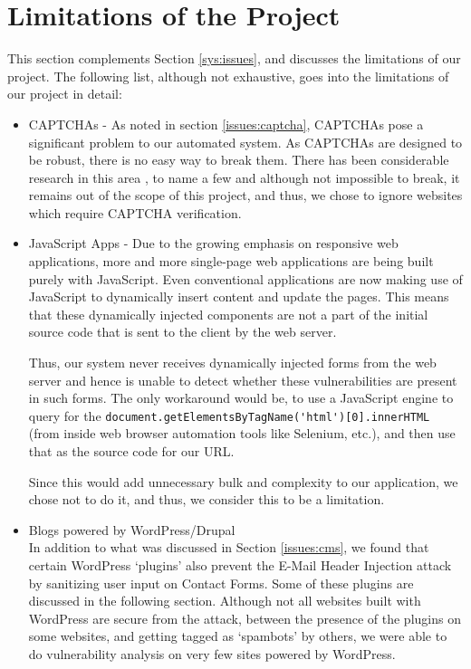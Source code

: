 \section[Limitations]{Limitations of the Project}
\label{limitations}
	This section complements Section \ref{sys:issues}, and discusses the limitations of our project. The following list, although not exhaustive, goes into the limitations of our project in detail: 
	\begin{itemize}
		\item CAPTCHAs - As noted in section \ref*{issues:captcha}, CAPTCHAs pose a significant problem to our automated system. As CAPTCHAs are designed to be robust, there is no easy way to break them. There has been considerable research in this area \cite{captchas2}, \cite{captchas} to name a few and although not impossible to break, it remains out of the scope of this project, and thus, we chose to ignore websites which require CAPTCHA verification.
		\item JavaScript Apps - Due to the growing emphasis on responsive web applications, more and more single-page web applications are being built purely with JavaScript. Even conventional applications are now making use of JavaScript to dynamically insert content and update the pages. This means that these dynamically injected components are not a part of the initial source code that is sent to the client by the web server.
		
		Thus, our system never receives dynamically injected forms from the web server and hence is unable to detect whether these vulnerabilities are present in such forms. The only workaround would be, to use a JavaScript engine to query for the \lstinline|document.getElementsByTagName('html')[0].innerHTML| (from inside web browser automation tools like Selenium, etc.), and then use that as the source code for our URL.
		
		Since this would add unnecessary bulk and complexity to our application, we chose not to do it, and thus, we consider this to be a limitation.
		
		\item Blogs powered by WordPress/Drupal\\
        In addition to what was discussed in Section \ref{issues:cms}, we found that certain WordPress `plugins' also prevent the E-Mail Header Injection attack by sanitizing user input on Contact Forms. Some of these plugins are discussed in the following section. Although not all websites built with WordPress are secure from the attack, between the presence of the plugins on some websites, and getting tagged as `spambots' by others, we were able to do vulnerability analysis on very few sites powered by WordPress.
		

\end{itemize}
